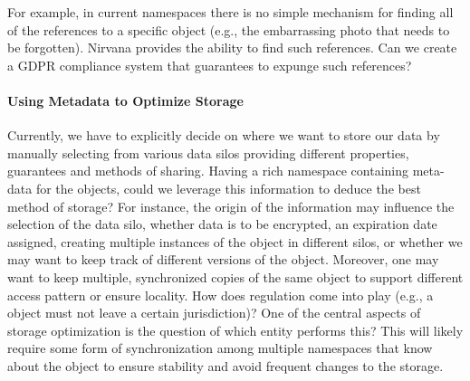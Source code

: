 For example, in current namespaces there is no simple mechanism for finding all of the references to a specific object (e.g., the embarrassing photo that needs to be forgotten).
Nirvana provides the ability to find such references.  Can we create a GDPR compliance system that guarantees to expunge such references?


\paragraph{Using Metadata to Optimize Storage}
Currently, we have to explicitly decide on where we want to store our data by manually selecting from various data silos providing different properties, guarantees and methods of sharing. 
Having a rich namespace containing meta-data for the objects, could we leverage this information to deduce the best method of storage? 
For instance, the origin of the information may influence the selection of the data silo, whether data is to be encrypted, an expiration date assigned, creating multiple instances of the object in different silos, or whether we may want to keep track of different versions of the object.
Moreover, one may want to keep multiple, synchronized copies of the same object to support different access pattern or ensure locality. 
How does regulation come into play (e.g., a object must not leave a certain jurisdiction)? 
One of the central aspects of storage optimization is the question of which entity performs this? 
This will likely require some form of synchronization among multiple namespaces that know about the object to ensure stability and avoid frequent changes to the storage.




